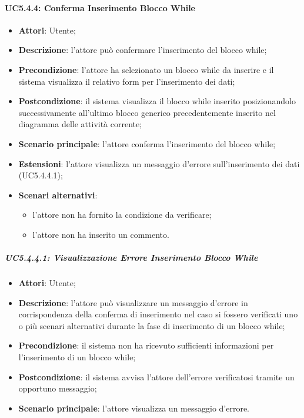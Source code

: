 \paragraph{UC5.4.4: Conferma Inserimento Blocco While}
\label{UC5.4.4}
\begin{itemize}
\item \textbf{Attori}: Utente;
\item \textbf{Descrizione}: l'attore può confermare l'inserimento del blocco while;	
\item \textbf{Precondizione}: l'attore ha selezionato un blocco while da inserire e il sistema visualizza il relativo form per l'inserimento dei dati;	
\item \textbf{Postcondizione}: il sistema visualizza il blocco while inserito posizionandolo successivamente all'ultimo blocco generico precedentemente inserito nel diagramma delle attività corrente;	
\item \textbf{Scenario principale}:
l'attore conferma l'inserimento del blocco while;	
\item \textbf{Estensioni}:
l'attore visualizza un messaggio d'errore sull'inserimento dei dati (UC5.4.4.1);	
\item \textbf{Scenari alternativi}:
\begin{itemize}
\item l'attore non ha fornito la condizione da verificare;
\item l'attore non ha inserito un commento.
\end{itemize}
\end{itemize}

\subparagraph{UC5.4.4.1: Visualizzazione Errore Inserimento Blocco While}
\label{UC5.4.4.1}
\begin{itemize}
\item \textbf{Attori}: Utente;
\item \textbf{Descrizione}: l'attore può visualizzare un messaggio d'errore in corrispondenza della conferma di inserimento nel caso si fossero verificati uno o più scenari alternativi durante la fase di inserimento di un blocco while;	
\item \textbf{Precondizione}: il sistema non ha ricevuto sufficienti informazioni per l'inserimento di un blocco while;	
\item \textbf{Postcondizione}: il sistema avvisa l'attore dell'errore verificatosi tramite un opportuno messaggio;	
\item \textbf{Scenario principale}:
l'attore visualizza un messaggio d'errore.	
\end{itemize}

